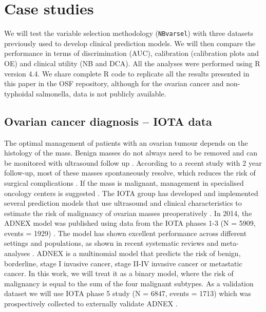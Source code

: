 \section{Case studies}

We will test the variable selection methodology (\texttt{NBvarsel}) with three datasets previously used to develop clinical prediction models. We will then compare the performance in terms of discrimination (\gls{AUC}), calibration (calibration plots and \gls{OE}) and clinical utility (\gls{NB}  and \gls{DCA}). All the analyses were performed using R version 4.4. We share complete R code to replicate all the results presented in this paper in the OSF repository, although for the ovarian cancer and non-typhoidal salmonella, data is not publicly available.

\subsection{Ovarian cancer diagnosis -- IOTA data}

The optimal management of patients with an ovarian tumour depends on the histology of the mass. Benign masses do not always need to be removed and can be monitored with ultrasound follow up \cite{carleyLaparoscopyLaparotomyManagement2002}. According to a recent study with 2 year follow-up, most of these masses spontaneously resolve, which reduces the risk of surgical complications \cite{froymanRiskComplicationsPatients2019}. If the mass is malignant, management in specialised oncology centers is suggested \cite{timmermanESGOISUOGIOTA2021}. The IOTA group has developed and implemented several prediction models that use ultrasound and clinical characteristics to estimate the risk of malignancy of ovarian masses preoperatively \cite{kaijserImprovingStrategiesDiagnosing2013}. In 2014, the ADNEX model was published using data from the IOTA phases 1-3 (N = 5909, events = 1929) \cite{vancalsterEvaluatingRiskOvarian2014}. The model has shown excellent performance across different settings and populations, as shown in recent systematic reviews and meta-analyses \cite{barrenadaADNEXRiskPrediction2024,barrenadaHeadHeadComparison2025}. ADNEX is a multinomial model that predicts the risk of benign, borderline, stage I invasive cancer, stage II-IV invasive cancer or metastatic cancer. In this work, we will treat it as a binary model, where the risk of malignancy is equal to the sum of the four malignant subtypes. As a validation dataset we will use IOTA phase 5 study (N = 6847, events = 1713) which was prospectively collected to externally validate ADNEX \cite{vancalsterValidationModelsDiagnose2020}.


